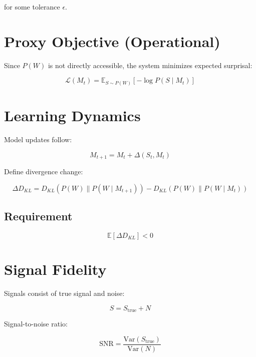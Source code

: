 \documentclass[11pt]{article}
\begin{document}
for some tolerance $\epsilon$.

\section{Proxy Objective (Operational)}

Since $P(W)$ is not directly accessible, the system minimizes expected surprisal:

\begin{equation}
\mathcal{L}(M_t) = \mathbb{E}_{S \sim P(W)}[-\log P(S \mid M_t)]
\end{equation}

\section{Learning Dynamics}

Model updates follow:

\begin{equation}
M_{t+1} = M_t + \Delta(S_t, M_t)
\end{equation}

Define divergence change:

\begin{equation}
\Delta D_{KL} = D_{KL}(P(W)\parallel P(W \mid M_{t+1})) - D_{KL}(P(W)\parallel P(W \mid M_t))
\end{equation}

\subsection*{Requirement}

\begin{equation}
\mathbb{E}[\Delta D_{KL}] < 0
\end{equation}

\section{Signal Fidelity}

Signals consist of true signal and noise:

\begin{equation}
S = S_{\text{true}} + N
\end{equation}

Signal-to-noise ratio:

\begin{equation}
\text{SNR} = \frac{\mathrm{Var}(S_{\text{true}})}{\mathrm{Var}(N)}
\end{equation}
\end{document}
